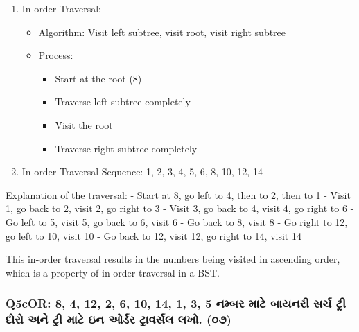 \begin{enumerate}
\def\labelenumi{\arabic{enumi}.}
\setcounter{enumi}{1}
\tightlist
\item
  In-order Traversal:

  \begin{itemize}
  \tightlist
  \item
    Algorithm: Visit left subtree, visit root, visit right subtree
  \item
    Process:

    \begin{itemize}
    \tightlist
    \item
      Start at the root (8)
    \item
      Traverse left subtree completely
    \item
      Visit the root
    \item
      Traverse right subtree completely
    \end{itemize}
  \end{itemize}
\item
  In-order Traversal Sequence: 1, 2, 3, 4, 5, 6, 8, 10, 12, 14
\end{enumerate}

Explanation of the traversal: - Start at 8, go left to 4, then to 2,
then to 1 - Visit 1, go back to 2, visit 2, go right to 3 - Visit 3, go
back to 4, visit 4, go right to 6 - Go left to 5, visit 5, go back to 6,
visit 6 - Go back to 8, visit 8 - Go right to 12, go left to 10, visit
10 - Go back to 12, visit 12, go right to 14, visit 14

This in-order traversal results in the numbers being visited in
ascending order, which is a property of in-order traversal in a BST.

\hypertarget{q5cor-8-4-12-2-6-10-14-1-3-5-uxaa8uxaaeuxaacuxab0-uxaaeuxa9f-uxaacuxaafuxaa8uxab0-uxab8uxab0uxa9a-uxa9fuxab0-uxaa6uxab0-uxa85uxaa8-uxa9fuxab0-uxaaeuxa9f-uxa87uxaa8-uxa93uxab0uxaa1uxab0-uxa9fuxab0uxab5uxab0uxab8uxab2-uxab2uxa96.-uxae6uxaed}{%
\subsubsection{Q5cOR: 8, 4, 12, 2, 6, 10, 14, 1, 3, 5 નમ્બર માટે બાયનરી
સર્ચ ટ્રી દોરો અને ટ્રી માટે ઇન ઓર્ડર ટ્રાવર્સલ લખો.
(૦૭)}\label{q5cor-8-4-12-2-6-10-14-1-3-5-uxaa8uxaaeuxaacuxab0-uxaaeuxa9f-uxaacuxaafuxaa8uxab0-uxab8uxab0uxa9a-uxa9fuxab0-uxaa6uxab0-uxa85uxaa8-uxa9fuxab0-uxaaeuxa9f-uxa87uxaa8-uxa93uxab0uxaa1uxab0-uxa9fuxab0uxab5uxab0uxab8uxab2-uxab2uxa96.-uxae6uxaed}}

